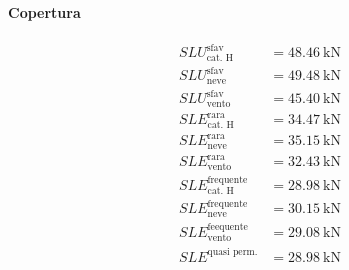 \paragraph*{Copertura} 
\begin{align*} 
	SLU^{\text{sfav}}_{\text{cat. H}}		&= \SI{48.46}{\kilo\newton} \\
	SLU^{\text{sfav}}_{\text{neve}}	 	    &= \SI{49.48}{\kilo\newton} \\
	SLU^{\text{sfav}}_{\text{vento}}		&= \SI{45.40}{\kilo\newton} \\	
	SLE^{\text{rara}}_{\text{cat. H}} 		&= \SI{34.47}{\kilo\newton} \\
	SLE^{\text{rara}}_{\text{neve}} 		&= \SI{35.15}{\kilo\newton} \\
	SLE^{\text{rara}}_{\text{vento}} 		&= \SI{32.43}{\kilo\newton} \\
	SLE^{\text{frequente}}_{\text{cat. H}} 	&= \SI{28.98}{\kilo\newton} \\
	SLE^{\text{frequente}}_{\text{neve}} 	&= \SI{30.15}{\kilo\newton} \\
	SLE^{\text{feequente}}_{\text{vento}}   &= \SI{29.08}{\kilo\newton} \\
	SLE^{\text{quasi perm.}}                &= \SI{28.98}{\kilo\newton}
\end{align*}

